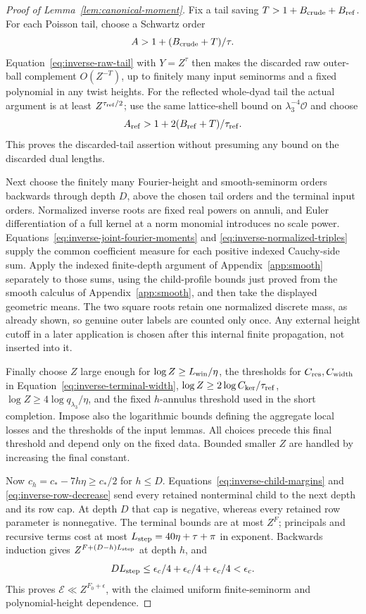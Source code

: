 \documentclass[12pt]{article}
\begin{document}
\begin{proof}[Proof of Lemma~\ref{lem:canonical-moment}]
Fix a tail saving \(T>1+B_{\rm crude}+B_{\rm ref}\).  For each Poisson
tail, choose a Schwartz order
\[
 A>1+(B_{\rm crude}+T)/\tau.
\]
Equation~\eqref{eq:inverse-raw-tail} with \(Y=Z^\tau\) then makes the
discarded raw outer-ball complement \(O(Z^{-T})\), up to finitely many
input seminorms and a fixed polynomial in any twist heights.  For the
reflected whole-dyad tail the actual argument is at least
\(Z^{\tau_{\rm ref}/2}\); use the same lattice-shell bound on
\(\lambda_3^{-4}\mathcal O\) and choose
\[
 A_{\rm ref}>1+2(B_{\rm ref}+T)/\tau_{\rm ref}.
\]
This proves the discarded-tail assertion without presuming any bound on
the discarded dual lengths.

Next choose the finitely many Fourier-height and smooth-seminorm orders
backwards through depth \(D\), above the chosen tail orders and the
terminal input orders.  Normalized inverse roots are fixed real powers
on annuli, and Euler differentiation of a full kernel at a norm monomial
introduces no scale power.  Equations~\eqref{eq:inverse-joint-fourier-moments}
and \eqref{eq:inverse-normalized-triples} supply the common coefficient
measure for each positive indexed Cauchy-side sum.  Apply
the indexed finite-depth argument of Appendix~\ref{app:smooth} separately to those sums,
using the child-profile bounds just proved from
the smooth calculus of Appendix~\ref{app:smooth}, and then take the displayed geometric
means.  The two square roots retain one normalized discrete mass, as
already shown, so genuine outer labels are counted only once.
Any external height cutoff in a later application
is chosen after this internal finite propagation, not inserted into it.

Finally choose \(Z\) large enough for \(\log Z\ge L_{\rm win}/\eta\),
the thresholds for \(C_{\rm res},C_{\rm width}\) in
Equation~\eqref{eq:inverse-terminal-width},
\(\log Z\ge2\log C_{\rm ker}/\tau_{\rm ref}\),
\(\log Z\ge4\log q_{\lambda_3}/\eta\), and the fixed \(h\)-annulus threshold
used in the short completion.  Impose also the logarithmic bounds defining
the aggregate local losses and the thresholds of the input lemmas.
All choices precede this final threshold and depend only on the fixed
data.  Bounded smaller \(Z\) are handled by increasing the final constant.

Now \(c_h=c_*-7h\eta\ge c_*/2\) for \(h\le D\).
Equations~\eqref{eq:inverse-child-margins} and
\eqref{eq:inverse-row-decrease} send every retained nonterminal child to
the next depth and its row cap.  At depth \(D\) that cap is negative,
whereas every retained row parameter is nonnegative.  The terminal bounds
are at most \(Z^F\); principals and recursive terms cost at most
\(L_{\rm step}=40\eta+\tau+\pi\) in exponent.  Backwards induction gives
\(Z^{F+(D-h)L_{\rm step}}\) at depth \(h\), and
\[
 D L_{\rm step}\le\epsilon_c/4+\epsilon_c/4+\epsilon_c/4<\epsilon_c.
\]
This proves \(\mathcal E\ll Z^{F_0+\epsilon}\), with the claimed
uniform finite-seminorm and polynomial-height dependence.
\end{proof}
\end{document}
